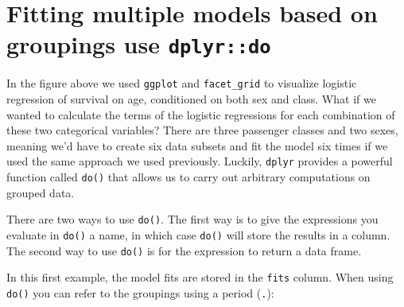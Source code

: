 \documentclass[]{book}
\newenvironment{Shaded}{\begin{snugshade}}{\end{snugshade}}
\newcommand{\CommentTok}[1]{\textcolor[rgb]{0.56,0.35,0.01}{\textit{#1}}}
\newcommand{\DataTypeTok}[1]{\textcolor[rgb]{0.13,0.29,0.53}{#1}}
\newcommand{\KeywordTok}[1]{\textcolor[rgb]{0.13,0.29,0.53}{\textbf{#1}}}
\newcommand{\NormalTok}[1]{#1}
\newcommand{\OperatorTok}[1]{\textcolor[rgb]{0.81,0.36,0.00}{\textbf{#1}}}
\newcommand{\StringTok}[1]{\textcolor[rgb]{0.31,0.60,0.02}{#1}}
\theoremstyle{definition}
\theoremstyle{definition}
\theoremstyle{definition}
\theoremstyle{remark}
\begin{document}
\hypertarget{fitting-multiple-models-based-on-groupings-use-dplyrdo}{%
\section{\texorpdfstring{Fitting multiple models based on groupings use
\texttt{dplyr::do}}{Fitting multiple models based on groupings use dplyr::do}}\label{fitting-multiple-models-based-on-groupings-use-dplyrdo}}

In the figure above we used \texttt{ggplot} and \texttt{facet\_grid} to
visualize logistic regression of survival on age, conditioned on both
sex and class. What if we wanted to calculate the terms of the logistic
regressions for each combination of these two categorical variables?
There are three passenger classes and two sexes, meaning we'd have to
create six data subsets and fit the model six times if we used the same
approach we used previously. Luckily, \texttt{dplyr} provides a powerful
function called \texttt{do()} that allows us to carry out arbitrary
computations on grouped data.

There are two ways to use \texttt{do()}. The first way is to give the
expressions you evaluate in \texttt{do()} a name, in which case
\texttt{do()} will store the results in a column. The second way to use
\texttt{do()} is for the expression to return a data frame.

In this first example, the model fits are stored in the \texttt{fits}
column. When using \texttt{do()} you can refer to the groupings using a
period (\texttt{.}):

\begin{Shaded}
\end{Shaded}
\end{document}
